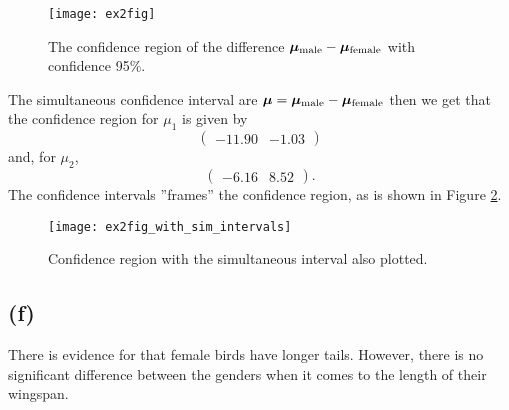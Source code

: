 \begin{figure}[h]
  \centering
  \texttt{[image: ex2fig]}
  \caption{The confidence region of the difference
    $\bm{\mu}_{\rm male} - \bm{\mu}_{\rm female}$ with confidence 95\%. }
  \label{fig:ex2fig}
\end{figure}
The simultaneous confidence interval are $\bm{\mu} = \bm{\mu}_{\rm male}- \bm{\mu}_{\rm female}$ then we get that the confidence region for $\mu_{1}$
is given by 
\begin{equation*}
  \begin{pmatrix}
   -11.90 &-1.03  
  \end{pmatrix}
\end{equation*}
and, for $\mu_{2}$, 
\begin{equation*}
  \begin{pmatrix}
   -6.16 &8.52  
  \end{pmatrix}.
\end{equation*}
The confidence intervals ''frames'' the confidence region, as is shown
in Figure \ref{fig:ex2_sim_intervals}. 
\begin{figure}[h]
  \centering
  \texttt{[image: ex2fig\_with\_sim\_intervals]}
  \caption{Confidence region with the simultaneous interval also
    plotted. }
  \label{fig:ex2_sim_intervals}
\end{figure}
\subsection*{(f)}
\label{sec:f}
There is evidence for that female birds have longer tails. However,
there is no significant difference between the genders when it comes to
the length of their wingspan. 


